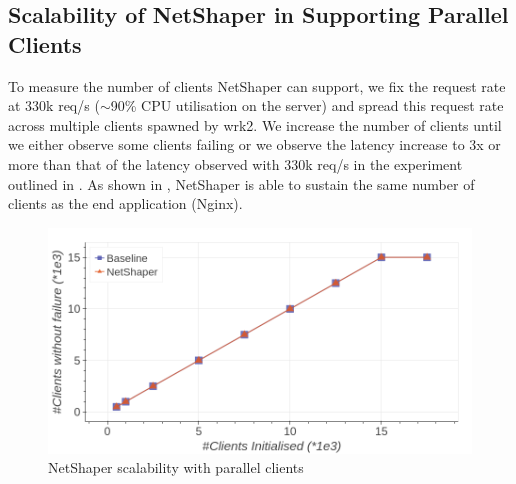 \subsection{Scalability of NetShaper in Supporting Parallel Clients}
\label{subsec:netshaper-evaluation-num-clients}

To measure the number of clients NetShaper can support, we fix the request rate at 330k req/s ($\sim$90\% CPU utilisation on the server) and spread this request rate across multiple clients spawned by wrk2.
We increase the number of clients until we either observe some clients failing or we observe the latency increase to 3x or more than that of the latency observed with 330k req/s in the experiment outlined in .
As shown in , NetShaper is able to sustain the same number of clients as the end application (Nginx).

\begin{figure}[!htb]
    \centering
    \includegraphics[width=\columnwidth]{figures/netshaper/evaluation/num_clients.png}
    \caption{NetShaper scalability with parallel clients}
    \label{fig:netshaper-eval-parallel-clients}
\end{figure}